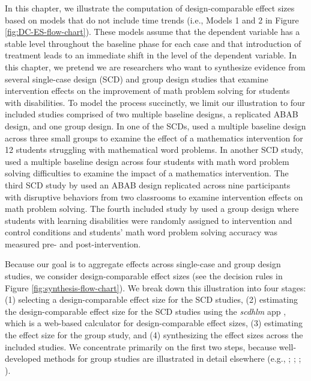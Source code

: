\documentclass[
]{book}
\begin{document}
In this chapter, we illustrate the computation of design-comparable effect sizes based on models that do not include time trends (i.e., Models 1 and 2 in Figure \ref{fig:DC-ES-flow-chart}). These models assume that the dependent variable has a stable level throughout the baseline phase for each case and that introduction of treatment leads to an immediate shift in the level of the dependent variable.
In this chapter, we pretend we are researchers who want to synthesize evidence from several single-case design (SCD) and group design studies that examine intervention effects on the improvement of math problem solving for students with disabilities. To model the process succinctly, we limit our illustration to four included studies comprised of two multiple baseline designs, a replicated ABAB design, and one group design.
In one of the SCDs, \citet{peltier2020Effects} used a multiple baseline design across three small groups to examine the effect of a mathematics intervention for 12 students struggling with mathematical word problems. In another SCD study, \citet{case1992Improving} used a multiple baseline design across four students with math word problem solving difficulties to examine the impact of a mathematics intervention. The third SCD study by \citet{lambert2006effects} used an ABAB design replicated across nine participants with disruptive behaviors from two classrooms to examine intervention effects on math problem solving. The fourth included study by \citet{hutchinson1993Effects} used a group design where students with learning disabilities were randomly assigned to intervention and control conditions and students' math word problem solving accuracy was measured pre- and post-intervention.

Because our goal is to aggregate effects across single-case and group design studies, we consider design-comparable effect sizes (see the decision rules in Figure \ref{fig:synthesis-flow-chart}). We break down this illustration into four stages: (1) selecting a design-comparable effect size for the SCD studies, (2) estimating the design-comparable effect size for the SCD studies using the \emph{scdhlm} app \citep{pustejovsky2021scdhlm}, which is a web-based calculator for design-comparable effect sizes, (3) estimating the effect size for the group study, and (4) synthesizing the effect sizes across the included studies. We concentrate primarily on the first two steps, because well-developed methods for group studies are illustrated in detail elsewhere (e.g., \citet{borenstein2021introduction}; \citet{cooper2019handbook}; \citet{Hedges1981distribution}; \citet{Hedges2007effect}).
\end{document}
